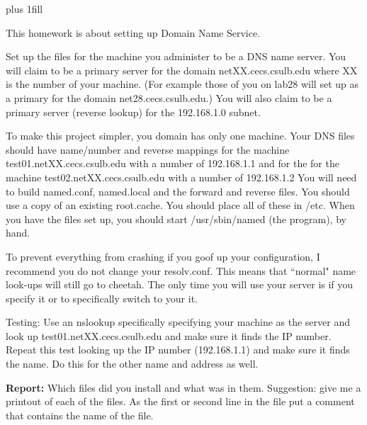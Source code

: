 
\rightskip=0pt plus 1fill

\parindent 0pt

This homework is about setting up Domain Name Service.

Set up the files for the machine you administer
to be a DNS name server. 
You will claim to be a primary server for the domain netXX.cecs.csulb.edu 
where XX is the number of your machine.
(For example those of you on lab28 will set up as a primary
for the domain net28.cecs.csulb.edu.)
You will also claim to be a primary
server (reverse lookup) for the 192.168.1.0 subnet.

To make this project simpler, you domain has only one machine.
Your DNS files should have name/number and reverse mappings
for the machine {\ltt{}test01.netXX.cecs.csulb.edu} 
with a number of {\ltt{}192.168.1.1}
and for the 
for the machine {\ltt{}test02.netXX.cecs.csulb.edu} 
with a number of {\ltt{}192.168.1.2}
You will need to build {\ltt{}named.conf},
{\ltt{}named.local} and the forward and reverse files.
You should use a copy of an existing {\ltt{}root.cache}.
You should place all of these in {\ltt{}/etc}.
When you have the files set up, you should start {\ltt{}/usr/sbin/named} 
(the program), by hand.

To prevent everything from crashing if you goof up your configuration,
I recommend you do not change your resolv.conf.
This means that ``normal" name look-ups will still go to cheetah.
The only time you will use your server is if you specify it or
to specifically switch to your it.

Testing: Use an {\ltt{}nslookup} specifically specifying your machine as 
the server and look up {\ltt{}test01.netXX.cecs.csulb.edu} and make sure
it finds the IP number.
Repeat this test looking up the IP number ({\ltt{}192.168.1.1})
and make sure it finds the name.
Do this for the other name and address as well.

{\bf Report:} Which files did you install and what was in them.
Suggestion: give me a printout of each of the files. As the first or second
line in the file put a comment that contains the name of the file.

\bye

